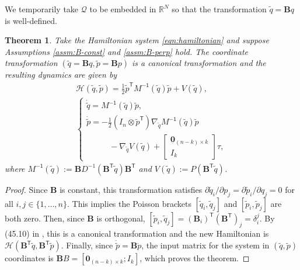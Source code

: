 \documentclass[journal,twoside,web, onecolumn, draftcls]{ieeecolor}
\newtheorem{thm}{Theorem}%
\newcommand*{\tpose}{^\mathsf{T}}
\newcommand*{\R}{\mathbb{R}}
\newcommand*{\Minv}{M^\mathsf{-1}}
\newcommand*{\Id}[1]{I_{#1}}
\newcommand*{\Zmat}[1]{\bm{0}_{#1}}
\newcommand*{\simpleB}{\begin{bmatrix}\Zmat{(n-k)\times k}\\ \Id{k}\end{bmatrix}}
\begin{document}
We temporarily take \(\mathcal{Q}\) to be embedded in \(\R^N\) so that the
transformation \(\tilde{q} = \mathbf{B}q\) is well-defined.

\begin{thm}\label{thm:simply-actuated}
    Take the Hamiltonian system \eqref{eqn:hamiltonian} and suppose
    Assumptions \ref{assm:B-const} and \ref{assm:B-perp} hold.
    The coordinate transformation
    \(\left(\tilde{q} = \mathbf{B}q, \tilde{p} = \mathbf{B}p\right)\)
    is a canonical transformation and the resulting dynamics are given by 
    \begin{gather}\label{eqn:simple-hamiltonian}
        \mathcal{H}(\tilde{q},\tilde{p}) = 
        \frac{1}{2} \tilde{p}\tpose \Minv(\tilde{q}) \tilde{p} + V(\tilde{q})
        , \\
       \begin{cases}
           \dot{\tilde{q}} = \Minv(\tilde{q})\tilde{p}
           , \\
           \dot{\tilde{p}} = -\frac{1}{2} (\Id{n} \otimes \tilde{p}\tpose)
           \nabla_{\tilde{q}} \Minv(\tilde{q}) \tilde{p} \\
           \phantom{---} - \nabla_{\tilde{q}} V(\tilde{q}) + \simpleB \tau
            ,
        \end{cases} \nonumber
    \end{gather}
    where 
    \(\Minv(\tilde{q}) := 
    \mathbf{B}D^{-1}(\mathbf{B}\tpose \tilde{q})\mathbf{B}\tpose\)
    and
    \(V(\tilde{q}) := P(\mathbf{B}\tpose \tilde{q})\).
\end{thm}
\begin{proof}
    Since \(\mathbf{B}\) is constant, this transformation satisfies
    \(\partial\tilde{q}_i/\partial p_j = \partial\tilde{p}_i/\partial q_j = 0\) for all 
    \(i,j \in \{1,\ldots,n\}\).
    This implies the Poisson brackets \([\tilde{q}_i, \tilde{q}_j]\)
    and \([\tilde{p}_i,\tilde{p}_j]\) are both zero.
    Then, since \(\mathbf{B}\) is orthogonal, 
    \([\tilde{p}_i, \tilde{q}_j] = (\mathbf{B}_i)\tpose (\mathbf{B}\tpose)_j
        = \delta_i^j\).
    By (45.10) in \cite{landau_mechanics}, this is a canonical transformation
    and the new Hamiltonian is
    \(\mathcal{H}(\mathbf{B}\tpose \tilde{q}, \mathbf{B}\tpose \tilde{p})\).
    Finally, since \(\dot{\tilde{p}} = \mathbf{B} \dot{p}\), the input
    matrix for the system in \((\tilde{q},\tilde{p})\) coordinates is
    \(\mathbf{B}B = [\Zmat{(n-k)\times k}; \Id{k}]\), which proves the theorem.
\end{proof}
\end{document}
